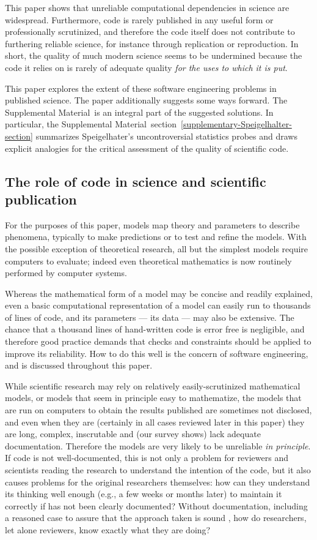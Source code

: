 \documentclass[10pt,letterpaper]{article}
\def\supplement{Supplemental Material}
\begin{document}
This paper shows that unreliable computational dependencies in science are widespread. Furthermore, code is rarely published in any useful form or professionally scrutinized, and therefore the code itself does not contribute to furthering reliable science, for instance through replication or reproduction. In short, the quality of much modern science seems to be undermined because the code it relies on is rarely of adequate quality \emph{for the uses to which it is put}. 

This paper explores the extent of these software engineering problems in published science. The paper additionally suggests some ways forward. The \supplement\ is an integral part of the suggested solutions. In particular, the \supplement\ section~\ref{supplementary-Speigelhalter-section} summarizes Speigelhater's uncontroversial statistics probes and draws explicit analogies for the critical assessment of the quality of scientific code.

\subsection{The role of code in science and scientific publication}

For the purposes of this paper, models map theory and parameters to describe phenomena, typically to make predictions or to test and refine the models. With the possible exception of theoretical research, all but the simplest models require computers to evaluate; indeed even theoretical mathematics is now routinely performed by computer systems.

Whereas the mathematical form of a model may be concise and readily explained, even a basic computational representation of a model can easily run to thousands of lines of code, and its parameters --- its data --- may also be extensive. The chance that a thousand lines of hand-written code is error free is negligible, and therefore good practice demands that checks and constraints should be applied to improve its reliability. How to do this well is the concern of software engineering, and is discussed throughout this paper. 

While scientific research may rely on relatively easily-scrutinized mathematical models, or models that seem in principle easy to mathematize, the models that are run on computers to obtain the results published are sometimes not disclosed, and even when they are (certainly in all cases reviewed later in this paper) they are long, complex, inscrutable and (our survey shows) lack adequate documentation. Therefore the models are very likely to be unreliable \emph{in principle}. If code is not well-documented, this is not only a problem for reviewers and scientists reading the research to understand the intention of the code, but it also causes problems for the original researchers themselves: how can they understand its thinking well enough (e.g., a few weeks or months later) to maintain it correctly if has not been clearly documented? Without documentation, including a reasoned case to assure that the approach taken is sound \cite{assurance-case}, how do researchers, let alone reviewers, know exactly what they are doing?
\end{document}
